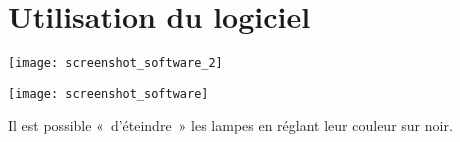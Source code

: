 \section{Utilisation du logiciel}

{\centering
\texttt{[image: screenshot\_software\_2]}}

{\centering
\texttt{[image: screenshot\_software]}}

Il est possible «~d'éteindre~» les lampes en réglant leur couleur sur noir.

